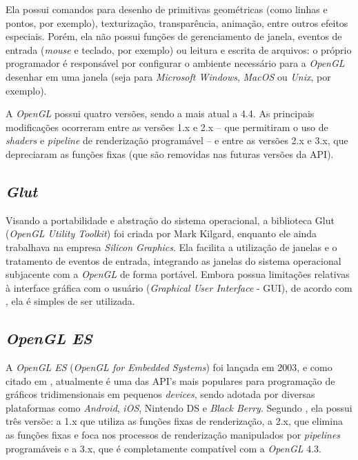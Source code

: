 	Ela possui comandos para desenho de primitivas geométricas (como linhas e pontos, por exemplo), texturização, transparência, animação,  entre outros efeitos especiais.  Porém, ela não possui funções de gerenciamento de janela, eventos de entrada (\textit{mouse} e teclado, por exemplo) ou leitura e escrita de arquivos: o próprio programador é responsável por configurar o ambiente necessário para a \textit{OpenGL} desenhar em uma janela (seja para \textit{Microsoft Windows}, \textit{MacOS} ou \textit{Unix}, por exemplo). 

	A \textit{OpenGL} possui quatro versões, sendo a mais atual a 4.4. As principais modificações ocorreram entre as versões 1.x e 2.x -- que permitiram o uso de \textit{shaders} e \textit{pipeline} de renderização programável -- e entre as versões 2.x e 3.x, que depreciaram as funções fixas (que são removidas nas futuras versões da API). 
 
\subsection{\textit{Glut}}

	Visando a portabilidade e abstração do sistema operacional, a biblioteca Glut (\textit{OpenGL Utility Toolkit}) foi criada por Mark Kilgard, enquanto ele ainda trabalhava na empresa \textit{Silicon Graphics}. Ela facilita a utilização de janelas e o tratamento de eventos de entrada, integrando as janelas do sistema operacional subjacente com a  \textit{OpenGL} de forma portável. Embora possua limitações relativas à interface gráfica com o usuário (\textit{Graphical User Interface} - GUI), de acordo com  \cite{opengl2011}, ela é simples de ser utilizada. 

\subsection{\textit{OpenGL ES}}
	
	A \textit{OpenGL ES} (\textit{OpenGL for Embedded Systems}) foi lançada em 2003, e como citado em \cite{guha2011}, atualmente é uma das API's mais populares para programação de gráficos tridimensionais em pequenos \textit{devices}, sendo adotada por diversas plataformas como \textit{Android}, \textit{iOS}, Nintendo DS e \textit{Black Berry}. Segundo \cite{opengles2012}, ela possui três versõe: a 1.x que utiliza as funções fixas de renderização, a 2.x, que elimina as funções fixas e foca nos processos de renderização manipulados por \textit{pipelines} programáveis e a 3.x, que é completamente compatível com a  \textit{OpenGL} 4.3.  

